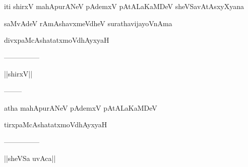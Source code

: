 \documentclass{article}
\begin{document}
\begin{center}
iti shirxV mahApurANeV pAdemxV pAtALaKaMDeV sheVSavAtAsxyXyana
\end{center}

\begin{center}
saMvAdeV rAmAshavxmeVdheV surathavijayoVnAma
\end{center}

\begin{center}
divxpaMcAshatatxmoVdhAyxyaH
\end{center}

\begin{center}
---------------
\end{center}

\begin{center}
||shirxV||
\end{center}

\begin{center}
--------
\end{center}

\begin{center}
atha mahApurANeV pAdemxV pAtALaKaMDeV
\end{center}

\begin{center}
tirxpaMcAshatatxmoVdhAyxyaH
\end{center}

\begin{center}
---------------
\end{center}

\begin{center}
||sheVSa uvAca||
\end{center}
\end{document}
